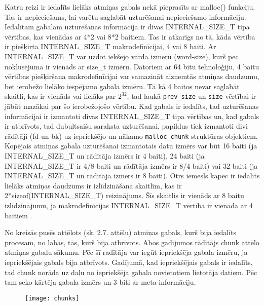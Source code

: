Katru reizi ir iedalīts lielāks atmiņas gabals nekā pieprasīts ar malloc() funkciju.
Tas ir nepieciešams, lai varētu saglabāt uzturēšanai nepieciešamo informāciju. 
Iedalītam gabalam uzturēšanas informācija ir divas INTERNAL\_SIZE\_T tipa vērtības, kas vienādas ar 4*2 vai 8*2 baitiem. 
Tas ir atkarīgs no tā, kāda vērtība ir piešķirta INTERNAL\_SIZE\_T makrodefinīcijai, 4 vai 8 baiti.
Ar INTERNAL\_SIZE\_T var uzdot iekšējo vārda izmēru (word-size), kurš pēc noklusējuma ir vienāds ar size\_t izmēru.
Datoriem ar 64 bitu tehnoloģiju, 4 baitu vērtības piešķiršana makrodefinīcijai  var samazināt aizņemtās atmiņas daudzumu, bet ierobežo lielāko iespējamo gabala izmēru.
Tā kā 4 baitos nevar saglabāt skaitli, kas ir vienāds vai lielāks par \(2^{32}\), tad laukā \texttt{prev\_size} un \texttt{size} vērtībai ir jābūt mazākai par šo ierobežojošo vērtību.
Kad gabals ir iedalīts, tad uzturēšanas informācijai ir izmantoti divas INTERNAL\_SIZE\_T tipa vērtības un, kad gabals ir atbrīvots, tad  dubultsaišu saraksta uzturēšanai, papildus tiek izmantoti divi rādītāji (fd un bk) uz iepriekšējo un nākamo \texttt{malloc\_chunk} struktūras objektiem. 
Kopējais atmiņas gabala uzturēšanai izmantotais datu izmērs var būt 16 baiti (ja INTERNAL\_SIZE\_T un rādītāja izmērs ir 4 baiti), 24 baiti (ja INTERNAL\_SIZE\_T ir 4/8 baiti un rādītāja izmērs ir 8/4 baiti) vai 32 baiti (ja INTERNAL\_SIZE\_T un rādītāja izmērs ir 8 baiti).  
Otrs iemesls kāpēc ir iedalīts lielāks atmiņas daudzums ir izlīdzināšana skaitlim, kas ir  2*sizeof(INTERNAL\_SIZE\_T) reizinājums. Šīs skaitlis ir vienāds ar 8 baitu izlīdzinājumu, ja  makrodefinīcijas INTERNAL\_SIZE\_T vērtība  ir vienāda ar 4 baitiem \cite {MALLOC}.  




No kreisās pusēs attēlots (sk. 2.7. attēlu) \cite{CHOFM} atmiņas gabals, kurš bija iedalīts procesam, no labās, tās, kurš bija atbrīvots.
Abos gadījumos rādītājs chunk attēlo atmiņas gabalu sākumu. Pēc šī radītāja var iegūt iepriekšēja gabala izmēru, ja iepriekšējais gabals bija atbrīvots.
Gadījumā, kad iepriekšējais gabals ir iedalīts, tad chunk norāda uz daļu no iepriekšēja gabala novietotiem lietotāja datiem. 
Pēc tam seko kārtēja gabala izmērs un 3 biti ar meta informāciju. 
 \begin{figure}[h]
\begin{center}
\texttt{[image: chunks]}
\end{center}
\caption{\textbf{\fontsize{11}{12}\selectfont {Atmiņas gabalu struktūra}}}
\label{fig:chunks}
\end{figure}

